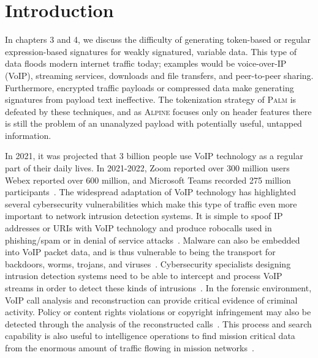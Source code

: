 \section{Introduction}

In chapters 3 and 4, we discuss the difficulty of generating token-based or regular expression-based signatures for weakly signatured, variable data. This type of data floods modern internet traffic today; examples would be voice-over-IP (VoIP), streaming services, downloads and file transfers, and peer-to-peer sharing. Furthermore, encrypted traffic payloads or compressed data make generating signatures from payload text ineffective. The tokenization strategy of \textsc{Palm} is defeated by these techniques, and as \textsc{Alpine} focuses only on header features there is still the problem of an unanalyzed payload with potentially useful, untapped information.

In 2021, it was projected that 3 billion people use VoIP technology as a regular part of their daily lives. In 2021-2022, Zoom reported over 300 million users~\cite{teamstage} Webex reported over 600 million, and Microsoft Teams recorded 275 million participants~\cite{businessofapps}. The widespread adaptation of VoIP technology has highlighted several cybersecurity vulnerabilities which make this type of traffic even more important to network intrusion detection systems. It is simple to spoof IP addresses or URIs with VoIP technology and produce robocalls used in phishing/spam or in denial of service attacks~\cite{edwards2020robocalling}. Malware can also be embedded into VoIP packet data, and is thus vulnerable to being the transport for backdoors, worms, trojans, and viruses~\cite{Wu2021SteganographyAS, nagaraja2019voiploc}. Cybersecurity specialists designing intrusion detection systems need to be able to intercept and process VoIP streams in order to detect these kinds of intrusions~\cite{choti2021prediction}. In the forensic environment, VoIP call analysis and reconstruction can provide critical evidence of criminal activity. Policy or content rights violations or copyright infringement may also be detected through the analysis of the reconstructed calls~\cite{kmetfast, Sha2016VoIPFA}. This process and search capability is also useful to intelligence operations to find mission critical data from the enormous amount of traffic flowing in mission networks~\cite{kao2020forensic}.

